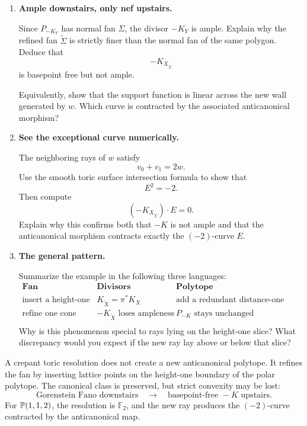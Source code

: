 \begin{enumerate}[label=\textbf{Hint \arabic*.},wide=0pt]
The new ray contributes the additional inequality
\[
\langle(a,b),w\rangle=b\geq-1.
\]
Show that this inequality is already implied by
\[
a\geq-1,
\qquad
a-2b\leq1.
\]
Conclude that
\[
P_{-K_{X_{\widetilde\Sigma}}}
=
P_{-K_Y}.
\]
Interpret this equality as
\[
-K_{X_{\widetilde\Sigma}}
=
\pi^*(-K_Y).
\]

\item \textbf{Ample downstairs, only nef upstairs.}

Since \(P_{-K_Y}\) has normal fan \(\Sigma\), the divisor \(-K_Y\)
is ample. Explain why the refined fan \(\widetilde\Sigma\) is strictly
finer than the normal fan of the same polygon. Deduce that
\[
-K_{X_{\widetilde\Sigma}}
\]
is basepoint free but not ample.

Equivalently, show that the support function is linear across the new
wall generated by \(w\). Which curve is contracted by the associated
anticanonical morphism?

\item \textbf{See the exceptional curve numerically.}

The neighboring rays of \(w\) satisfy
\[
v_0+v_1=2w.
\]
Use the smooth toric surface intersection formula to show that
\[
E^2=-2.
\]
Then compute
\[
(-K_{X_{\widetilde\Sigma}})\cdot E=0.
\]
Explain why this confirms both that \(-K\) is not ample and that the
anticanonical morphism contracts exactly the \((-2)\)-curve \(E\).

\item \textbf{The general pattern.}

Summarize the example in the following three languages:
\[
\begin{array}{c|c|c}
\textbf{Fan} & \textbf{Divisors} & \textbf{Polytope}\\
\hline
\text{insert a height-one ray}
&
K_{\widetilde X}=\pi^*K_X
&
\text{add a redundant distance-one inequality}
\\
\text{refine one cone}
&
-K_{\widetilde X}\text{ loses ampleness}
&
P_{-K}\text{ stays unchanged}
\\
\end{array}
\]
Why is this phenomenon special to rays lying on the height-one slice?
What discrepancy would you expect if the new ray lay above or below
that slice?

\end{enumerate}

\begin{tcolorbox}[
  colback=PredictionTeal!5,
  colframe=PredictionTeal,
  title={The lesson of the resolution},
  fonttitle=\bfseries
]
A crepant toric resolution does not create a new anticanonical
polytope. It refines the fan by inserting lattice points on the
height-one boundary of the polar polytope. The canonical class is
preserved, but strict convexity may be lost:
\[
\boxed{
\text{Gorenstein Fano downstairs}
\quad\longrightarrow\quad
\text{basepoint-free }-K\text{ upstairs}.
}
\]
For \(\mathbb{P}(1,1,2)\), the resolution is \(\mathbb F_2\), and the new
ray produces the \((-2)\)-curve contracted by the anticanonical map.
\end{tcolorbox}

